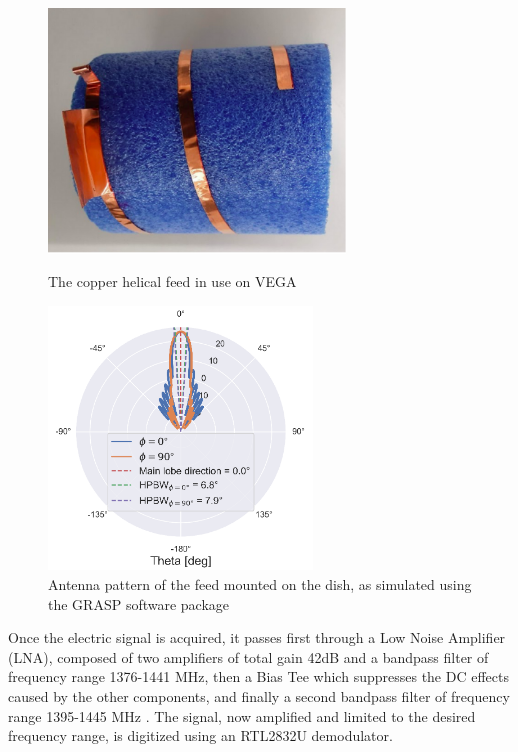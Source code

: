\begin{figure}[htbp]
    \begin{minipage}[t]{0.5\textwidth}
        \centering
        \captionsetup{width=.9\textwidth}
        \includegraphics[height=6.5cm]{figures/antenna_photo.png}
        \caption{The copper helical feed in use on VEGA}
        \label{fig:antenna_photo}
    \end{minipage}
    \begin{minipage}[t]{0.5\textwidth}
        \centering
        \captionsetup{width=.9\textwidth}
        \includegraphics[height=7cm]{figures/antenna_pattern.png}
        \caption{Antenna pattern of the feed mounted on the dish, as simulated using the GRASP software package \cite{rapport_interne_2024}}
        \label{fig:antenna_pattern}
    \end{minipage}
\end{figure}

Once the electric signal is acquired, it passes first through a Low Noise Amplifier (LNA), composed of two amplifiers of total gain 42dB and a bandpass filter of frequency range 1376-1441 MHz, then a Bias Tee which suppresses the DC effects caused by the other components, and finally a second bandpass filter of frequency range 1395-1445 MHz \cite{interdisciplinary_project_2022}.
The signal, now amplified and limited to the desired frequency range, is digitized using an RTL2832U demodulator. 


